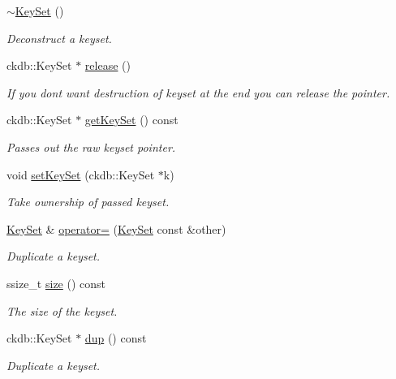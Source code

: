 \begin{DoxyCompactItemize}
\hyperlink{classkdb_1_1KeySet_ade654f92bddec24abad1b651e828f2b8}{$\sim$\+Key\+Set} ()
\begin{DoxyCompactList}\small\item\em Deconstruct a keyset. \end{DoxyCompactList}\item 
\mbox{\label{classkdb_1_1KeySet_a2987b3fb1b12196399650726f1c18f02}} 
ckdb\+::\+Key\+Set $\ast$ \hyperlink{classkdb_1_1KeySet_a2987b3fb1b12196399650726f1c18f02}{release} ()
\begin{DoxyCompactList}\small\item\em If you don\textquotesingle{}t want destruction of keyset at the end you can release the pointer. \end{DoxyCompactList}\item 
ckdb\+::\+Key\+Set $\ast$ \hyperlink{classkdb_1_1KeySet_a4e9a3906e0b18a783f8a6e8bdbec9ed0}{get\+Key\+Set} () const
\begin{DoxyCompactList}\small\item\em Passes out the raw keyset pointer. \end{DoxyCompactList}\item 
void \hyperlink{classkdb_1_1KeySet_a9f3ec4eebe304185527b08a6fa01b77c}{set\+Key\+Set} (ckdb\+::\+Key\+Set $\ast$k)
\begin{DoxyCompactList}\small\item\em Take ownership of passed keyset. \end{DoxyCompactList}\item 
\hyperlink{classkdb_1_1KeySet}{Key\+Set} \& \hyperlink{classkdb_1_1KeySet_a1c54736b7206bc2253d02a5bf4b3ccfb}{operator=} (\hyperlink{classkdb_1_1KeySet}{Key\+Set} const \&other)
\begin{DoxyCompactList}\small\item\em Duplicate a keyset. \end{DoxyCompactList}\item 
ssize\+\_\+t \hyperlink{classkdb_1_1KeySet_ab01c5c46e4c0802560b8f15886af89c4}{size} () const
\begin{DoxyCompactList}\small\item\em The size of the keyset. \end{DoxyCompactList}\item 
ckdb\+::\+Key\+Set $\ast$ \hyperlink{classkdb_1_1KeySet_ad3f2b936d66729690e8a8a45b5074baa}{dup} () const
\begin{DoxyCompactList}\small\item\em Duplicate a keyset. \end{DoxyCompactList}\item 

\end{DoxyCompactItemize}
